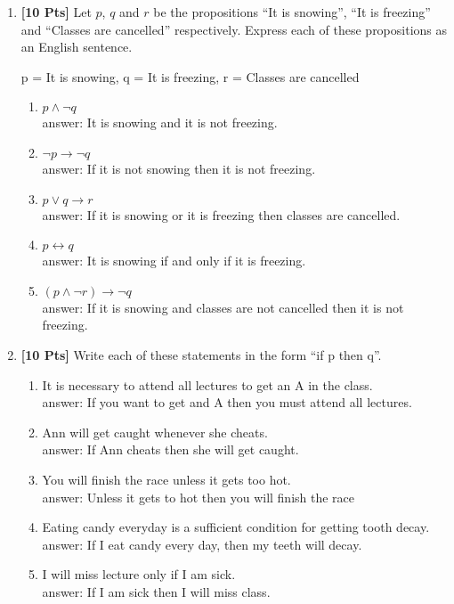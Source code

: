\begin{enumerate}

\item {\bf [10 Pts]} Let $p$, $q$ and $r$ be the propositions ``It is snowing'', ``It is freezing'' and ``Classes are cancelled'' respectively. Express each of these propositions as an English sentence.

p = It is snowing, q = It is freezing, r = Classes are cancelled

\begin{enumerate}
\item $p \wedge \neg q$
\\answer: It is snowing and it is not freezing.
\item $\neg p \rightarrow \neg q$
\\answer: If it is not snowing then it is not freezing.
\item $p \vee q \rightarrow r$ 
\\answer: If it is snowing or it is freezing then classes are cancelled.
\item $p \leftrightarrow q$
\\answer: It is snowing if and only if it is freezing.
\item $(p \wedge \neg r) \rightarrow \neg q$
\\answer: If it is snowing and classes are not cancelled then it is not freezing.
\end{enumerate}

\item {\bf [10 Pts]} Write each of these statements in the form ``if p then q''.

\begin{enumerate}
\item It is necessary to attend all lectures to get an A in the class.
\\answer: If you want to get and A then you must attend all lectures.
\item Ann will get caught whenever she cheats.
\\answer: If Ann cheats then she will get caught.
\item You will finish the race unless it gets too hot.
\\answer: Unless it gets to hot then you will finish the race
\item Eating candy everyday is a sufficient condition for getting tooth decay.
\\answer: If I eat candy every day, then my teeth will decay.
\item I will miss lecture only if I am sick.
\\answer: If I am sick then I will miss class.\\\\
\end{enumerate}


\end{enumerate}
